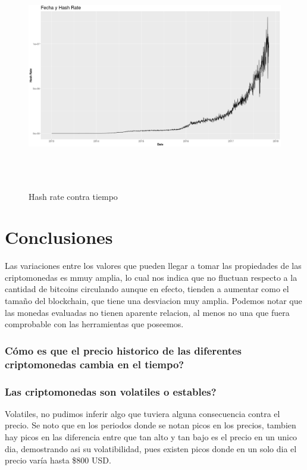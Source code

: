 \documentclass[12pt,letterpaper]{article}
\begin{document}
    \begin{figure}
        \centering

        \includegraphics[width = 18cm, height = 10cm]{btc/date_vs_hashRate}

        \caption{Hash rate contra tiempo}
    \end{figure}

\newpage

\section{Conclusiones}
	Las variaciones entre los valores que pueden llegar a tomar las propiedades de las criptomonedas es mmuy amplia, lo cual nos indica que no fluctuan respecto a la cantidad de bitcoins circulando aunque en efecto, tienden a aumentar como el tama\~no del blockchain, que tiene una desviacion muy amplia. Podemos notar que las monedas evaluadas no tienen aparente relacion, al menos no una que fuera comprobable con las herramientas que poseemos.
	\subsubsection*{C\'omo es que el precio historico de las diferentes criptomonedas cambia en el tiempo?}
	
	\subsubsection*{Las criptomonedas son volatiles o estables?}
	Volatiles, no pudimos inferir algo que tuviera alguna consecuencia contra el precio. Se noto que en los periodos donde se notan picos en los precios, tambien hay picos en las diferencia entre que tan alto y tan bajo es el precio en un unico dia, demostrando asi su volatibilidad, pues existen picos donde en un solo dia el precio var\'ia hasta \$800  USD.
\end{document}
